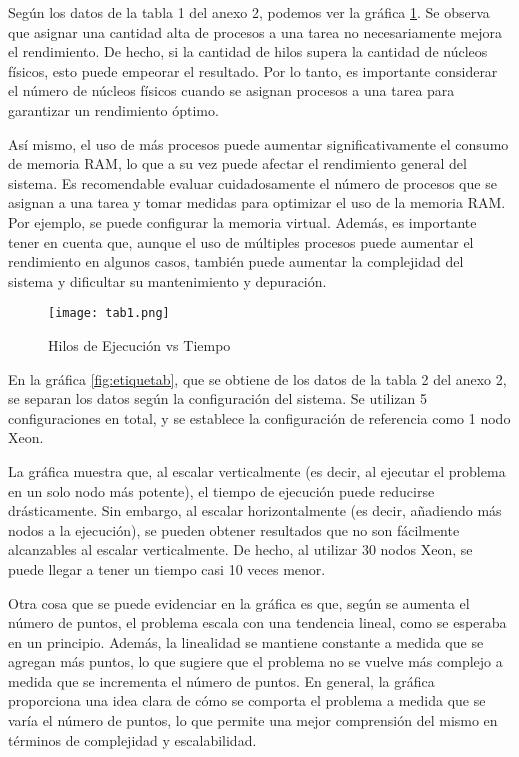 \begin{spacing}{1.5}
  Según los datos de la tabla 1 del anexo 2, podemos ver la gráfica \ref{fig:etiquetaa}. Se observa que asignar una cantidad alta de procesos a una tarea no necesariamente mejora el rendimiento. De hecho, si la cantidad de hilos supera la cantidad de núcleos físicos, esto puede empeorar el resultado. Por lo tanto, es importante considerar el número de núcleos físicos cuando se asignan procesos a una tarea para garantizar un rendimiento óptimo.

  Así mismo, el uso de más procesos puede aumentar significativamente el consumo de memoria RAM, lo que a su vez puede afectar el rendimiento general del sistema. Es recomendable evaluar cuidadosamente el número de procesos que se asignan a una tarea y tomar medidas para optimizar el uso de la memoria RAM. Por ejemplo, se puede configurar la memoria virtual. Además, es importante tener en cuenta que, aunque el uso de múltiples procesos puede aumentar el rendimiento en algunos casos, también puede aumentar la complejidad del sistema y dificultar su mantenimiento y depuración.\newpage

  \begin{figure}[h]
    \centering
    \texttt{[image: tab1.png]}
    \caption{Hilos de Ejecución vs Tiempo}
    \label{fig:etiquetaa}
  \end{figure}

  En la gráfica \ref{fig:etiquetab}, que se obtiene de los datos de la tabla 2 del anexo 2, se separan los datos según la configuración del sistema. Se utilizan 5 configuraciones en total, y se establece la configuración de referencia como 1 nodo Xeon.

  La gráfica muestra que, al escalar verticalmente (es decir, al ejecutar el problema en un solo nodo más potente), el tiempo de ejecución puede reducirse drásticamente. Sin embargo, al escalar horizontalmente (es decir, añadiendo más nodos a la ejecución), se pueden obtener resultados que no son fácilmente alcanzables al escalar verticalmente. De hecho, al utilizar 30 nodos Xeon, se puede llegar a tener un tiempo casi 10 veces menor.

  Otra cosa que se puede evidenciar en la gráfica es que, según se aumenta el número de puntos, el problema escala con una tendencia lineal, como se esperaba en un principio. Además, la linealidad se mantiene constante a medida que se agregan más puntos, lo que sugiere que el problema no se vuelve más complejo a medida que se incrementa el número de puntos. En general, la gráfica proporciona una idea clara de cómo se comporta el problema a medida que se varía el número de puntos, lo que permite una mejor comprensión del mismo en términos de complejidad y escalabilidad. \newpage


\end{spacing}
